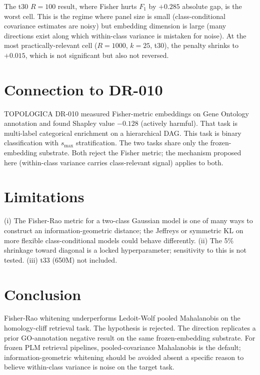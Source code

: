 \documentclass[11pt]{article}
\begin{document}
The t30 $R{=}100$ result, where Fisher hurts $F_1$ by $+0.285$ absolute gap, is the worst cell. This is the regime where panel size is small (class-conditional covariance estimates are noisy) but embedding dimension is large (many directions exist along which within-class variance is mistaken for noise). At the most practically-relevant cell ($R{=}1000$, $k{=}25$, t30), the penalty shrinks to $+0.015$, which is not significant but also not reversed.

\section{Connection to DR-010}
TOPOLOGICA DR-010 measured Fisher-metric embeddings on Gene Ontology annotation and found Shapley value $-0.128$ (actively harmful). That task is multi-label categorical enrichment on a hierarchical DAG. This task is binary classification with $s_{\max}$ stratification. The two tasks share only the frozen-embedding substrate. Both reject the Fisher metric; the mechanism proposed here (within-class variance carries class-relevant signal) applies to both.

\section{Limitations}
(i) The Fisher-Rao metric for a two-class Gaussian model is one of many ways to construct an information-geometric distance; the Jeffreys or symmetric KL on more flexible class-conditional models could behave differently. (ii) The 5\% shrinkage toward diagonal is a locked hyperparameter; sensitivity to this is not tested. (iii) t33 (650M) not included.

\section{Conclusion}
Fisher-Rao whitening underperforms Ledoit-Wolf pooled Mahalanobis on the homology-cliff retrieval task. The hypothesis is rejected. The direction replicates a prior GO-annotation negative result on the same frozen-embedding substrate. For frozen PLM retrieval pipelines, pooled-covariance Mahalanobis is the default; information-geometric whitening should be avoided absent a specific reason to believe within-class variance is noise on the target task.
\end{document}
